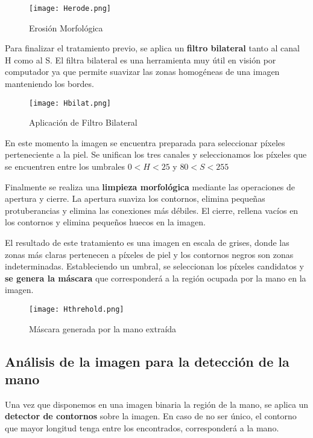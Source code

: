   \begin{figure} 
    \centering
    \texttt{[image: Herode.png]}
    \caption{Erosión Morfológica}
    \label{fig:Herode}
  \end{figure}



Para finalizar el tratamiento previo, se aplica un \textbf{filtro bilateral}
tanto al canal H como al S. El filtra bilateral es una herramienta muy
útil en visión por computador ya que permite suavizar las zonas
homogéneas de una imagen manteniendo los bordes.

\begin{figure} 
    \centering
    \texttt{[image: Hbilat.png]}
    \caption{Aplicación de Filtro Bilateral}
    \label{fig:Hbital}
  \end{figure}


En este momento la imagen se encuentra preparada para seleccionar
píxeles perteneciente a la piel. Se unifican los tres canales y
seleccionamos los píxeles que se encuentren entre los umbrales
$0 < H < 25$ y $80 < S < 255$

Finalmente se realiza una \textbf{limpieza morfológica} mediante las operaciones de
apertura y cierre. La apertura suaviza los contornos, elimina pequeñas
protuberancias y elimina las conexiones más débiles. El cierre,
rellena vacíos en los contornos y elimina pequeños huecos en la
imagen.

El resultado de este tratamiento es una imagen en escala de grises,
donde las zonas más claras pertenecen a píxeles de piel y los
contornos negros son zonas indeterminadas. Estableciendo un umbral, se
seleccionan los píxeles candidatos y \textbf{se genera la máscara} que
corresponderá a la región ocupada por la mano en la imagen.
\begin{figure} 
    \centering
    \texttt{[image: Hthrehold.png]}
    \caption{Máscara generada por la mano extraída}
    \label{fig:Hthrehold}
  \end{figure}

\subsection{Análisis de la imagen para la detección de la mano}
Una vez que disponemos en una imagen binaria la región de la mano,
se aplica un \textbf{detector de contornos} sobre la imagen. En caso de no ser
único, el contorno que mayor longitud tenga entre los encontrados, corresponderá
a la mano.

